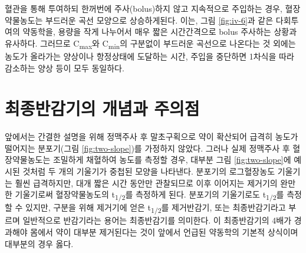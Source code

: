\documentclass[
  11pt,
  krantz2, a4paper, twoside]{krantz}
\theoremstyle{definition}
\theoremstyle{definition}
\theoremstyle{definition}
\theoremstyle{definition}
\theoremstyle{remark}
\begin{document}
혈관을 통해 투여하되 한꺼번에 주사(bolus)하지 않고 지속적으로 주입하는
경우, 혈장약물농도는 부드러운 곡선 모양으로 상승하게된다. 이는, 그림 \ref{fig:iv-6}과 같은 다회투여의 약동학을, 용량을 작게 나누어서 매우 짧은
시간간격으로 bolus 주사하는 상황과 유사하다. 그러므로 C\textsubscript{max}와 C\textsubscript{min}의
구분없이 부드러운 곡선으로 나온다는 것 외에는 농도가 올라가는 양상이나
항정상태에 도달하는 시간, 주입을 중단하면 1차식을 따라 감소하는 양상
등이 모두 동일하다.

\hypertarget{uxcd5cuxc885uxbc18uxac10uxae30uxc758-uxac1cuxb150uxacfc-uxc8fcuxc758uxc810}{%
\section{\texorpdfstring{최종반감기의 개념과 주의점}{최종반감기의 개념과 주의점}}\label{uxcd5cuxc885uxbc18uxac10uxae30uxc758-uxac1cuxb150uxacfc-uxc8fcuxc758uxc810}}

앞에서는 간결한 설명을 위해 정맥주사 후 말초구획으로 약이 확산되어
급격히 농도가 떨어지는 분포기(그림 \ref{fig:two-slope})를 가정하지 않았다. 그러나 실제
정맥주사 후 혈장약물농도는 조밀하게 채혈하여 농도를 측정할 경우, 대부분
그림 \ref{fig:two-slope}에 예시된 것처럼 두 개의 기울기가 중첩된 모양을 나타낸다.
분포기의 로그혈장농도 기울기는 훨씬 급격하지만, 대개 짧은 시간 동안만
관찰되므로 이후 이어지는 제거기의 완만한 기울기로써 혈장약물농도의
t\textsubscript{1/2}를 측정하게 된다. 분포기의 기울기로도 t\textsubscript{1/2}를 측정할 수 있지만,
구분을 위해 제거기에 얻은 t\textsubscript{1/2}를 제거반감기, 또는 최종반감기라고
부르며 일반적으로 반감기라는 용어는 최종반감기를 의미한다. 이
최종반감기의 4배가 경과해야 몸에서 약이 대부분 제거된다는 것이 앞에서
언급된 약동학의 기본적 상식이며 대부분의 경우 옳다.
\end{document}

